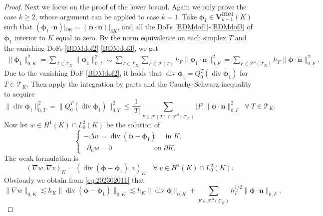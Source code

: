 \documentclass[10pt]{amsart}
\renewcommand{\div}{\operatorname{div}}
\numberwithin{equation}{section}
\begin{document}
\begin{proof}
Next we focus on the proof of the lower bound. Again we only prove the case $k\geq2$, whose argument can be applied to case $k=1$. Take $\boldsymbol{\phi}_1\in\boldsymbol{V}_{k-1}^{\mathrm{BDM}}(K)$ such that $(\boldsymbol{\phi}_1\cdot\boldsymbol{n})|_{\partial K}=(\boldsymbol{\phi}\cdot\boldsymbol{n})|_{\partial K}$, and all the DoFs \eqref{BDMdof1}-\eqref{BDMdof3} of $\boldsymbol{\phi}_1$ interior to $K$ equal to zero. 
By the norm equivalence on each simplex $T$ and the vanishing DoFs \eqref{BDMdof2}-\eqref{BDMdof3}, we get
\begin{align}\label{eq:20220324-5}
\|\boldsymbol{\phi}_1\|_{0,K}^2 = \sum_{T\in\mathcal T_K}\|\boldsymbol{\phi}_1\|_{0,T}^2 \eqsim \sum_{T\in\mathcal T_K}\sum_{F\in\mathcal F(T)}h_F\|\boldsymbol{\phi}_1\cdot\boldsymbol{n}\|_{0,F}^2 =\sum_{F\in\mathcal F^{\partial}(\mathcal T_K)}h_F\|\boldsymbol{\phi}\cdot\boldsymbol{n}\|_{0,F}^2.
\end{align}
Due to the vanishing DoF \eqref{BDMdof2}, it holds that $\div\boldsymbol{\phi}_1=Q_0^T(\div\boldsymbol{\phi}_1)$ for $T\in\mathcal T_K$.
Then apply the integration by parts and the Cauchy-Schwarz inequality to acquire
\begin{equation}\label{eq:202302011}
\|\div\boldsymbol{\phi}_1\|_{0,T}^2=\|Q_0^T(\div\boldsymbol{\phi}_1)\|_{0,T}^2
\leq\frac{1}{|T|}\sum_{F\in\mathcal F(T)\cap\mathcal F^{\partial}(\mathcal T_K)}|F|\|\boldsymbol{\phi}\cdot\boldsymbol{n}\|_{0,F}^2\;\;\forall~T\in\mathcal T_K.
\end{equation}
Now let $w\in H^1(K)\cap L_0^2(K)$ be the solution of 
\[
\begin{cases}
-\Delta w= \div(\boldsymbol{\phi}-\boldsymbol{\phi}_1)\quad\textrm{ in } K, \\
\;\;\partial_nw=0\qquad\qquad\quad\;\;\,\textrm{ on } \partial K.
\end{cases}
\]
The weak formulation is
\[
(\nabla w, \nabla v)_K=(\div(\boldsymbol{\phi}-\boldsymbol{\phi}_1), v)_K\quad\forall~v\in H^1(K)\cap L_0^2(K).
\]
Obviously we obtain from \eqref{eq:202302011} that
\begin{equation}\label{eq:202302031}  
\|\nabla w\|_{0,K}\lesssim h_K\|\div(\boldsymbol{\phi}-\boldsymbol{\phi}_1)\|_{0,K}\lesssim h_K\|\div\boldsymbol{\phi}\|_{0,K} +\sum_{F\in\mathcal F^{\partial}(\mathcal T_K)}h_F^{1/2}\|\boldsymbol{\phi}\cdot\boldsymbol{n}\|_{0,F}.

\end{equation}
\end{proof}
\end{document}
